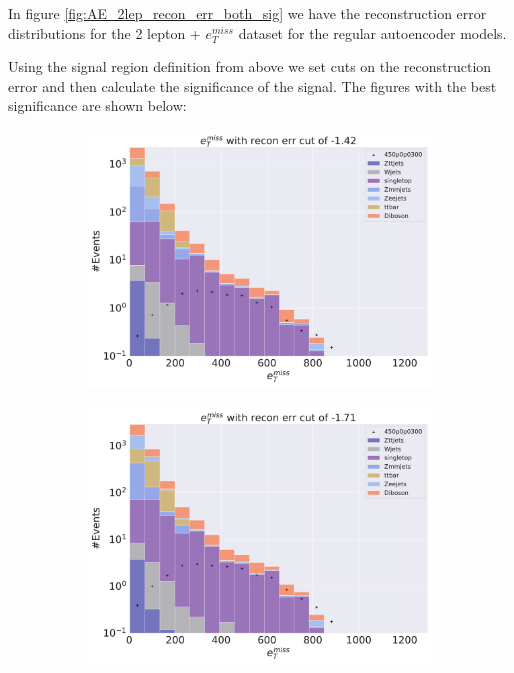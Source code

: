 In figure \ref{fig:AE_2lep_recon_err_both_sig} we have the reconstruction error distributions for the 2 lepton + $e_T^{miss}$ 
dataset for the regular autoencoder models. \par 
Using the signal region definition from above we set cuts on the reconstruction error and then calculate the significance of the signal. 
The figures with the best significance are shown below:

\begin{figure}
    \centering
    \begin{subfigure}{.45\textwidth}
        \includegraphics[width=\textwidth]{Figures/AE_testing/big/2lep/b_data_recon_big_rm3_feats_sig_450p0p0300_recon_errcut_-1.42.pdf}
        \caption{ }
        \label{fig:AE_2lep_big_450_cut_etmiss}
    \end{subfigure}
    \hfill
    \begin{subfigure}{.45\textwidth}
        \includegraphics[width=\textwidth]{Figures/AE_testing/small/2lep/b_data_recon_big_rm3_feats_sig_450p0p0300_recon_errcut_-1.71.pdf}

\end{subfigure}
\end{figure}
